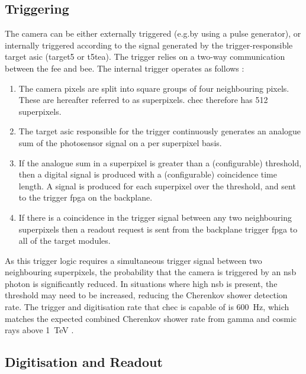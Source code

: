 \subsection{Triggering} \label{section:triggering}

The camera can be either externally triggered (e.g.\@ by using a pulse generator), or internally triggered according to the signal generated by the trigger-responsible \gls{target} \gls{asic} (\gls{target5} or \gls{t5tea}). The trigger relies on a two-way communication between the \gls{fee} and \gls{bee}. The internal trigger operates as follows \cite{Zorn2017}:
\begin{enumerate}
\item The camera pixels are split into square groups of four neighbouring pixels. These are hereafter referred to as \glspl{superpixel}. \gls{chec} therefore has 512 superpixels.
\item The \gls{target} \gls{asic} responsible for the trigger continuously generates an analogue sum of the photosensor signal on a per superpixel basis.
\item If the analogue sum in a superpixel is greater than a (configurable) threshold, then a digital signal is produced with a (configurable) coincidence time length. A signal is produced for each superpixel over the threshold, and sent to the trigger \gls{fpga} on the backplane.
\item If there is a coincidence in the trigger signal between any two neighbouring superpixels then a readout request is sent from the backplane trigger \gls{fpga} to all of the \gls{target} modules.
\end{enumerate}
As this trigger logic requires a simultaneous trigger signal between two neighbouring superpixels, the probability that the camera is triggered by an \gls{nsb} photon is significantly reduced. In situations where high \gls{nsb} is present, the threshold may need to be increased, reducing the Cherenkov shower detection rate. The trigger and digitisation rate that \gls{chec} is capable of is \SI{600}{Hz}, which matches the expected combined Cherenkov shower rate from gamma and cosmic rays above \SI{1}{TeV} \cite{Zorn2017}.

\subsection{Digitisation and Readout}

